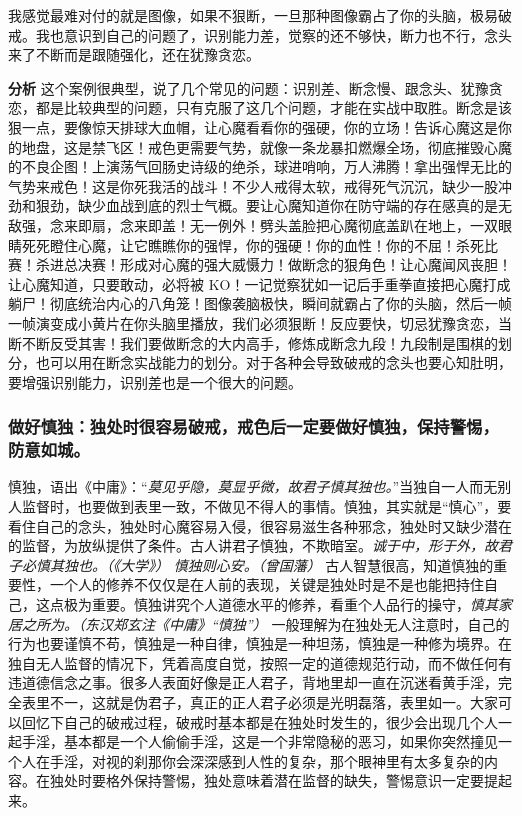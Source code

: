 \begin{case}[练习断念]
    我感觉最难对付的就是图像，如果不狠断，一旦那种图像霸占了你的头脑，极易破戒。我也意识到自己的问题了，识别能力差，觉察的还不够快，断力也不行，念头来了不断而是跟随强化，还在犹豫贪恋。

    \textbf{分析} 这个案例很典型，说了几个常见的问题：识别差、断念慢、跟念头、犹豫贪恋，都是比较典型的问题，只有克服了这几个问题，才能在实战中取胜。断念是该狠一点，要像惊天排球大血帽，让心魔看看你的强硬，你的立场！告诉心魔这是你的地盘，这是禁飞区！戒色更需要气势，就像一条龙暴扣燃爆全场，彻底摧毁心魔的不良企图！上演荡气回肠史诗级的绝杀，球进哨响，万人沸腾！拿出强悍无比的气势来戒色！这是你死我活的战斗！不少人戒得太软，戒得死气沉沉，缺少一股冲劲和狠劲，缺少血战到底的烈士气概。要让心魔知道你在防守端的存在感真的是无敌强，念来即扇，念来即盖！无一例外！劈头盖脸把心魔彻底盖趴在地上，一双眼睛死死瞪住心魔，让它瞧瞧你的强悍，你的强硬！你的血性！你的不屈！杀死比赛！杀进总决赛！形成对心魔的强大威慑力！做断念的狠角色！让心魔闻风丧胆！让心魔知道，只要敢动，必将被 KO！一记觉察犹如一记后手重拳直接把心魔打成躺尸！彻底统治内心的八角笼！图像袭脑极快，瞬间就霸占了你的头脑，然后一帧一帧演变成小黄片在你头脑里播放，我们必须狠断！反应要快，切忌犹豫贪恋，当断不断反受其害！我们要做断念的大内高手，修炼成断念九段！九段制是围棋的划分，也可以用在断念实战能力的划分。对于各种会导致破戒的念头也要心知肚明，要增强识别能力，识别差也是一个很大的问题。
\end{case}

\subsubsection{做好慎独：独处时很容易破戒，戒色后一定要做好慎独，保持警惕，防意如城。}

慎独，语出《中庸》：“\textit{莫见乎隐，莫显乎微，故君子慎其独也。}”当独自一人而无别人监督时，也要做到表里一致，不做见不得人的事情。慎独，其实就是“慎心”，要看住自己的念头，独处时心魔容易入侵，很容易滋生各种邪念，独处时又缺少潜在的监督，为放纵提供了条件。古人讲君子慎独，不欺暗室。\textit{诚于中，形于外，故君子必慎其独也。（《大学》）} \textit{慎独则心安。（曾国藩）} 古人智慧很高，知道慎独的重要性，一个人的修养不仅仅是在人前的表现，关键是独处时是不是也能把持住自己，这点极为重要。慎独讲究个人道德水平的修养，看重个人品行的操守，\textit{慎其家居之所为。（东汉郑玄注《中庸》“慎独”）} 一般理解为在独处无人注意时，自己的行为也要谨慎不苟，慎独是一种自律，慎独是一种坦荡，慎独是一种修为境界。在独自无人监督的情况下，凭着高度自觉，按照一定的道德规范行动，而不做任何有违道德信念之事。很多人表面好像是正人君子，背地里却一直在沉迷看黄手淫，完全表里不一，这就是伪君子，真正的正人君子必须是光明磊落，表里如一。大家可以回忆下自己的破戒过程，破戒时基本都是在独处时发生的，很少会出现几个人一起手淫，基本都是一个人偷偷手淫，这是一个非常隐秘的恶习，如果你突然撞见一个人在手淫，对视的刹那你会深深感到人性的复杂，那个眼神里有太多复杂的内容。在独处时要格外保持警惕，独处意味着潜在监督的缺失，警惕意识一定要提起来。

